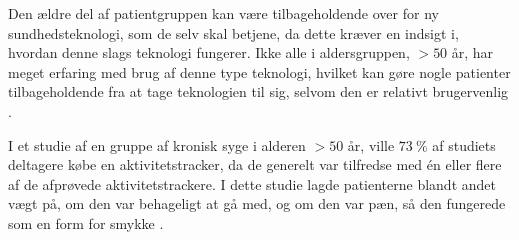 Den ældre del af patientgruppen kan være tilbageholdende over for ny sundhedsteknologi, som de selv skal betjene, da dette kræver en indsigt i, hvordan denne slags teknologi fungerer. Ikke alle i aldersgruppen, $>50$ år, har meget erfaring med brug af denne type teknologi, hvilket kan gøre nogle patienter tilbageholdende fra at tage teknologien til sig, selvom den er relativt brugervenlig \citep{mercer2016}. 

I et studie af en gruppe af kronisk syge i alderen $>50$ år, ville $73~\%$ af studiets deltagere købe en aktivitetstracker, da de generelt var tilfredse med én eller flere af de afprøvede aktivitetstrackere. I dette studie lagde patienterne blandt andet vægt på, om den var behageligt at gå med, og om den var pæn, så den fungerede som en form for smykke \citep{mercer2016}.